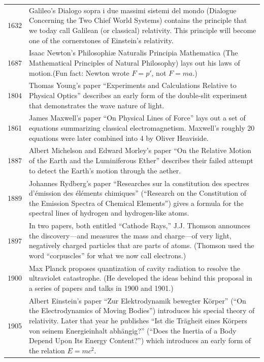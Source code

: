 \documentclass[../../main.tex]{subfiles}
\begin{document}
\begin{center}
    \begin{longtable}{p{}  p{}}
    1632&Galileo's Dialogo sopra i due massimi sistemi del mondo (Dialogue Concerning the Two Chief World Systems) contains the principle that we today call Galilean (or classical) relativity. This principle will become one of the cornerstones of Einstein's relativity.\\
1687&Isaac Newton's Philosophiæ Naturalis Principia Mathematica (The Mathematical Principles of Natural  Philosophy) lays out his laws of motion.(Fun fact: Newton wrote $F = p'$, not $F = ma$.)\\
1804&Thomas Young's paper “Experiments and Calculations Relative to Physical Optics” describes an early form of the double-slit experiment that demonstrates the wave nature of light.\\
1861&James Maxwell's paper “On Physical Lines of Force” lays out a set of equations summarizing classical electromagnetism. Maxwell's roughly 20 equations were later combined into 4 by Oliver Heaviside.\\
1887&Albert Michelson and Edward Morley's paper “On the Relative Motion of the Earth and the Luminiferous Ether” describes their failed attempt to detect the Earth's motion through the aether.\\
1889&Johannes Rydberg's paper “Researches sur la constitution des spectres d'émission des éléments chimiques” (“Research on the Constitution of the Emission Spectra of Chemical Elements”) gives a formula for the spectral lines of hydrogen and hydrogen-like atoms.\\
1897&In two papers, both entitled “Cathode Rays,” J.J. Thomson announces the discovery—and measures the mass and charge—of very light, negatively charged particles that are parts of atoms. (Thomson used the word “corpuscles” for what we now call electrons.) \\
1900&Max Planck proposes quantization of cavity radiation to resolve the ultraviolet catastrophe. (He developed the ideas behind this proposal in a series of papers and talks in 1900 and 1901.)\\
1905&Albert Einstein's paper “Zur Elektrodynamik bewegter Körper” (“On the Electrodynamics of Moving Bodies”) introduces his special theory of relativity. Later that year he publishes “Ist die Trägheit eines Körpers von seinem Energieinhalt abhängig?” (“Does the Inertia of a Body Depend Upon Its Energy Content?”) which introduces an early form of the relation $E = mc^2$.\\

\end{longtable}
\end{center}
\end{document}
